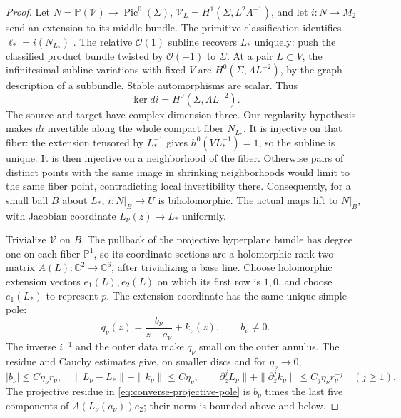 \documentclass[11pt]{amsart}
\theoremstyle{definition}
\theoremstyle{remark}
\theoremstyle{plain}
\newcommand{\CC}{\mathbb{C}}
\newcommand{\PP}{\mathbb{P}}
\begin{document}
\begin{proof}
Let $N=\PP(\mathcal V)\to\operatorname{Pic}^0(\Sigma)$,
$\mathcal V_L=H^1(\Sigma,L^2\Lambda^{-1})$, and let
$i:N\to M_2$ send an extension to its middle bundle.
The primitive classification identifies $\ell_*=i(N_{L_*})$
\cite[Propositions~2--3 and~5]{Munoz99b}.
The relative $\mathcal O(1)$ subline recovers $L_*$ uniquely:
push the classified product bundle twisted by
$\mathcal O(-1)$ to $\Sigma$.
At a pair $L\subset V$, the infinitesimal subline variations
with fixed $V$ are $H^0(\Sigma,\Lambda L^{-2})$, by the graph
description of a subbundle. Stable automorphisms are scalar.
Thus
\begin{equation}\label{eq:converse-extension-inverse}
                \ker di=H^0(\Sigma,\Lambda L^{-2}).
\end{equation}
The source and target have complex dimension three.
Our regularity hypothesis makes $di$ invertible along the
whole compact fiber $N_{L_*}$. It is injective on that fiber:
the extension tensored by $L_*^{-1}$ gives
$h^0(VL_*^{-1})=1$, so the subline is unique.
It is then injective on a neighborhood of the fiber.
Otherwise pairs of distinct points with the same image in
shrinking neighborhoods would limit to the same fiber point,
contradicting local invertibility there. Consequently, for a
small ball $B$ about $L_*$, $i:N|_B\to U$ is biholomorphic.
The actual maps lift to $N|_B$, with Jacobian coordinate
$L_\nu(z)\to L_*$ uniformly.

Trivialize $\mathcal V$ on $B$. The pullback of the projective
hyperplane bundle has degree one on each fiber $\PP^1$,
so its coordinate sections are a holomorphic rank-two matrix
$A(L):\CC^2\to\CC^6$, after trivializing a base line.
Choose holomorphic extension vectors $e_1(L),e_2(L)$ on which
its first row is $1,0$, and choose $e_1(L_*)$ to represent $p$.
The extension coordinate has the same unique simple pole:
\begin{equation}\label{eq:converse-extension-pole}
 q_\nu(z)=\frac{b_\nu}{z-a_\nu}+k_\nu(z),\qquad b_\nu\ne0.
\end{equation}
The inverse $i^{-1}$ and the outer data make $q_\nu$ small
on the outer annulus. The residue and Cauchy estimates give,
on smaller discs and for $\eta_\nu\to0$,
\[
 |b_\nu|\leq C\eta_\nu r_\nu,\quad
 \|L_\nu-L_*\|+\|k_\nu\|\leq C\eta_\nu,\quad
 \|\partial_z^jL_\nu\|+\|\partial_z^jk_\nu\|
                   \leq C_j\eta_\nu r_\nu^{-j}\quad(j\geq1).
\]
The projective residue in \eqref{eq:converse-projective-pole}
is $b_\nu$ times the last five components of $A(L_\nu(a_\nu))e_2$;
their norm is bounded above and below.


\end{proof}
\end{document}
